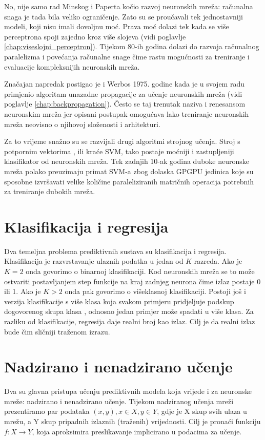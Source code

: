 \documentclass[times, utf8, diplomski, numeric]{fer}
\begin{document}
No, nije samo rad Minskog i Paperta kočio razvoj neuronskih mreža: računalna snaga je tada bila veliko ograničenje. Zato su se proučavali tek jednostavniji modeli, koji nisu imali dovoljnu moć. Prava moć dolazi tek kada se više perceptrona spoji zajedno kroz više slojeva (vidi poglavlje \ref{chap:viseslojni_perceptron}). Tijekom 80-ih godina dolazi do razvoja računalnog paralelizma i povećanja računalne snage čime rastu mogućnosti za treniranje i evaluacije kompleksnijih neuronskih mreža.

Značajan napredak postigao je i Werbos 1975. godine kada je u svojem radu \cite{Werbos:74} primjenio algoritam unazadne propagacije  za učenje neuronskih mreža (vidi poglavlje \ref{chap:backpropagation}).
Često se taj trenutak naziva i renesansom neuronskim mreža jer opisani postupak omogućava lako treniranje neuronskih mreža neovisno o njihovoj složenosti i arhitekturi.

Za to vrijeme snažno su se razvijali drugi algoritmi strojnog učenja. Stroj s potpornim vektorima , ili kraće SVM, tako postaje moćniji i zastupljeniji klasifikator od neuronskih mreža. Tek zadnjih 10-ak godina duboke neuronske mreža polako preuzimaju primat SVM-a zbog dolaska GPGPU  jedinica koje su sposobne izvršavati velike količine paraleliziranih matričnih operacija potrebnih za treniranje dubokih mreža.

\section{Klasifikacija i regresija}
Dva temeljna problema prediktivnih sustava su klasifikacija i regresija.
Klasifikacija je razvrstavanje ulaznih podatka u jedan od $K$ razreda. Ako je $K = 2$ onda govorimo o binarnoj klasifikaciji. Kod neuronskih mreža se to može ostvariti postavljanjem step funkcije na kraj zadnjeg neurona čime izlaz postaje 0 ili 1.
Ako je $K > 2$ onda pak govorimo o višeklasnoj  klasifikaciji. Postoji još i verzija klasifikacije s više klasa koja svakom primjeru pridjeljuje podskup dogovorenog skupa klasa , odnosno jedan primjer može spadati u više klasa.
Za razliku od klasifikacije, regresija daje realni broj kao izlaz. Cilj je da realni izlaz bude čim sličniji traženom izrazu.

\section{Nadzirano i nenadzirano učenje}
Dva su glavna pristupa učenju prediktivnih modela koja vrijede i za neuronske mreže: nadzirano i nenadzirano učenje. Tijekom nadziranog učenja mreži prezentiramo par podataka $(x, y), x \in X, y \in Y$, gdje je X skup svih ulaza u mrežu, a Y skup pripadnih izlaznih (traženih) vrijednosti.
Cilj je pronaći funkciju $f: X \to Y$, koja aproksimira preslikavanje implicirano u podacima za učenje.
\end{document}
